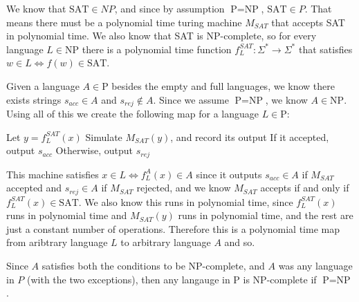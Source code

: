 \documentclass[english]{article}
\begin{document}
We know that $\textrm{SAT} \in NP$, and since by assumption
$\textrm{P} = \textrm{NP}$, $\textrm{SAT} \in P$. That means there must be a
polynomial time turing machine $M_{SAT}$ that accepts SAT in polynomial time.
We also know that SAT is NP-complete, so for every language $L \in \textrm{NP}$
there is a polynomial time function $f^{SAT}_L : \Sigma^* \rightarrow \Sigma^*$
that satisfies $w \in L \iff f(w) \in \textrm{SAT}$.

Given a language $A \in \textrm{P}$ besides the empty and full languages, we 
know there exists strings $s_{acc} \in A$ and $s_{rej} \notin A$. Since
we assume $\textrm{P} = \textrm{NP}$, we know $A \in \textrm{NP}$. Using all of
this we create the following map for a language $L \in \textrm{P}$:
\begin{algorithmic}
\State Let $y = f^{SAT}_L(x)$
\State Simulate $M_{SAT}(y)$, and record its output
\State If it accepted, output $s_{acc}$
\State Otherwise, output $s_{rej}$
\EndFunction 
\end{algorithmic}

This machine satisfies $x \in L \iff f^A_L(x) \in A$ since it outputs 
$s_{acc} \in A$ if $M_{SAT}$ accepted and $s_{rej} \in A$ if $M_{SAT}$
rejected, and we know $M_{SAT}$ accepts if and only if
$f^{SAT}_L(x) \in \textrm{SAT}$. We also know this runs in polynomial time,
since $f^{SAT}_L(x)$ runs in polynomial time and $M_{SAT}(y)$ runs in 
polynomial time, and the rest are just a constant number of operations.
Therefore this is a polynomial time map from aribtrary language $L$ to 
arbitrary language $A$ and so.

Since $A$ satisfies both the conditions to be NP-complete, and $A$ was 
any language in $P$ (with the two exceptions), then any langauge in P is
NP-complete if $\textrm{P} = \textrm{NP}$.
\end{document}
